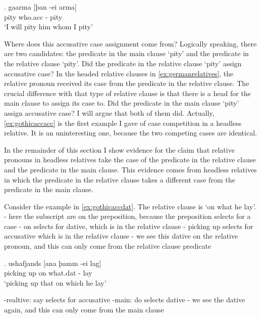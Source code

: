\exg. gaarma [þan -ei arma]\\
 pity\scsub{[acc]} who.\ac{acc} - pity\scsub{[acc]}\\
 `I will pity him whom I pity' \label{ex:gothicaccacc}

Where does this accusative case assignment come from? Logically speaking, there are two candidates: the predicate in the main clause  `pity' and the predicate in the relative clause  `pity'. Did the predicate in the relative clause  `pity' assign accusative case? In the headed relative clauses in \ref{ex:germanrelatives}, the relative pronoun received its case from the predicate in the relative clause. The crucial difference with that type of relative clause is that there is a head for the main clause to assign its case to. Did the predicate in the main clause  `pity' assign accusative case? I will argue that both of them did. Actually, \ref{ex:gothicaccacc} is the first example I gave of case competition in a headless relative. It is an uninteresting one, because the two competing cases are identical.

In the remainder of this section I show evidence for the claim that relative pronouns in headless relatives take the case of the predicate in the relative clause and the predicate in the main clause. This evidence comes from headless relatives in which the predicate in the relative clause takes a different case from the predicate in the main clause.

Consider the example in \ref{ex:gothicaccdat}. The relative clause is  `on what he lay'.
- here the subscript are on the preposition, because the preposition selects for a case
- on selects for dative, which is in the relative clause
- picking up selects for accusative which is in the relative clause
- we see this dative on the relative pronoun, and this can only come from the relative clause predicate

\exg. ushafjands [ana þamm -ei lag]\\
 {picking up}\scsub{[acc]} on\scsub{[dat]} what.\ac{dat} - lay\\
 `picking up that on which he lay' \label{ex:gothicaccdat}

-realtive: say selects for accusative
-main: do selects dative
- we see the dative again, and this can only come from the main clause

